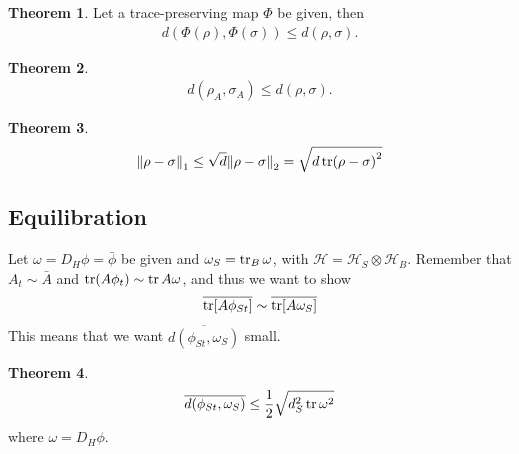 \documentclass{book}
\theoremstyle{definition}
\newtheorem{thm}{Theorem}[section]
\newcommand{\had}{\mathcal{H}}
\newcommand{\f}[2]{\frac{#1}{#2}}
\begin{document}
\begin{thm}
	Let a trace-preserving map $\Phi$ be given, then 
	\begin{align}
	d(\Phi(\rho) , \Phi(\sigma)) \leq d(\rho,\sigma).
	\end{align}
\end{thm} 


\begin{thm}
	\begin{align}
	d(\rho_A ,\sigma_A) \leq d(\rho,\sigma).
	\end{align}
\end{thm}

\begin{thm}
	\begin{align}
	\norm{\rho - \sigma}_1 \leq \sqrt{d}\norm{\rho - \sigma}_2 = \sqrt{d \tr (\rho - \sigma)^2}
	\end{align}
\end{thm}


\subsection{Equilibration}

Let $\omega = D_H \phi = \bar{\phi}$ be given and $\omega_S = \tr_B \omega$, with $\had = \had_S \otimes \had_B$. Remember that $A_t \sim \bar{A}$ and $\tr (A\phi_t) \sim \tr A \omega$, and thus we want to show
\begin{align}
\overline{\tr[A \phi_{St}]} \sim \overline{\tr [A \omega_S]}
\end{align}
This means that we want $\overline{d(\phi_{St}, \omega_S)}$ small.

\begin{thm}
	\begin{align}
	\overline{d(\phi_{St},\omega_S)} \leq \f{1}{2}\sqrt{d_S^2 \tr \omega^2}
	\end{align}
	where $\omega = D_H \phi$.
\end{thm} 
\end{document}
